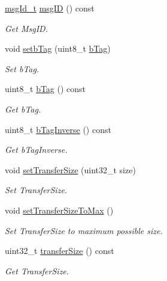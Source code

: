 \begin{DoxyCompactItemize}
\hyperlink{classmdt_usbtmc_frame_abf1e449c264011341c477d45eb700c42}{msg\-Id\-\_\-t} \hyperlink{classmdt_usbtmc_frame_aacd5285efda4efa0b7884418cb689b2e}{msg\-I\-D} () const 
\begin{DoxyCompactList}\small\item\em Get Msg\-I\-D. \end{DoxyCompactList}\item 
void \hyperlink{classmdt_usbtmc_frame_ad7d6081b22098dc74ff688f250faf3da}{setb\-Tag} (uint8\-\_\-t \hyperlink{classmdt_usbtmc_frame_a46d0574cdf95da840e4c6f5de314c15d}{b\-Tag})
\begin{DoxyCompactList}\small\item\em Set b\-Tag. \end{DoxyCompactList}\item 
uint8\-\_\-t \hyperlink{classmdt_usbtmc_frame_a46d0574cdf95da840e4c6f5de314c15d}{b\-Tag} () const 
\begin{DoxyCompactList}\small\item\em Get b\-Tag. \end{DoxyCompactList}\item 
uint8\-\_\-t \hyperlink{classmdt_usbtmc_frame_a99e7fe2dc11815b7d84ff0e7306cfe6b}{b\-Tag\-Inverse} () const 
\begin{DoxyCompactList}\small\item\em Get b\-Tag\-Inverse. \end{DoxyCompactList}\item 
void \hyperlink{classmdt_usbtmc_frame_aacf216cd3759dd0a3d533077d9573bef}{set\-Transfer\-Size} (uint32\-\_\-t size)
\begin{DoxyCompactList}\small\item\em Set Transfer\-Size. \end{DoxyCompactList}\item 
void \hyperlink{classmdt_usbtmc_frame_aca8334fa539afd3e331937e707c8f0a8}{set\-Transfer\-Size\-To\-Max} ()
\begin{DoxyCompactList}\small\item\em Set Transfer\-Size to maximum possible size. \end{DoxyCompactList}\item 
uint32\-\_\-t \hyperlink{classmdt_usbtmc_frame_a90b3b355c714309a82dfd6dbf493cf5d}{transfer\-Size} () const 
\begin{DoxyCompactList}\small\item\em Get Transfer\-Size. \end{DoxyCompactList}\item 

\end{DoxyCompactItemize}
